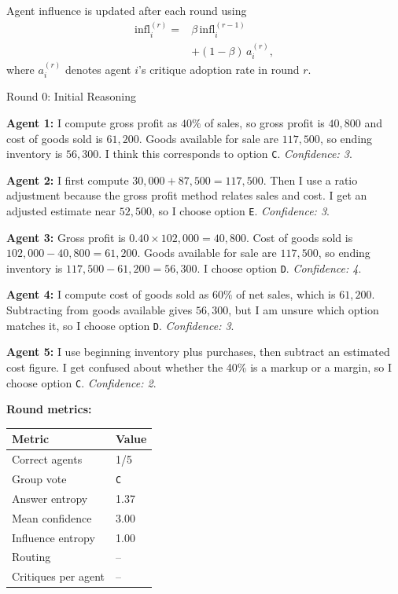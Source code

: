 Agent influence is updated after each round using
\[
\begin{aligned}
\mathrm{infl}_i^{(r)}={}&\beta\,\mathrm{infl}_i^{(r-1)}\\
&+(1-\beta)\,a_i^{(r)},
\end{aligned}
\]
where $a_i^{(r)}$ denotes agent $i$'s critique adoption rate in round $r$.

\begin{roundbox}{Round 0: Initial Reasoning}

\textbf{Agent 1:} I compute gross profit as $40\%$ of sales, so gross profit is $40{,}800$ and cost of goods sold is $61{,}200$. Goods available for sale are $117{,}500$, so ending inventory is $56{,}300$. I think this corresponds to option \texttt{C}. \textit{Confidence: 3}.

\textbf{Agent 2:} I first compute $30{,}000+87{,}500=117{,}500$. Then I use a ratio adjustment because the gross profit method relates sales and cost. I get an adjusted estimate near $52{,}500$, so I choose option \texttt{E}. \textit{Confidence: 3}.

\textbf{Agent 3:} Gross profit is $0.40\times 102{,}000=40{,}800$. Cost of goods sold is $102{,}000-40{,}800=61{,}200$. Goods available for sale are $117{,}500$, so ending inventory is $117{,}500-61{,}200=56{,}300$. I choose option \texttt{D}. \textit{Confidence: 4}.

\textbf{Agent 4:} I compute cost of goods sold as $60\%$ of net sales, which is $61{,}200$. Subtracting from goods available gives $56{,}300$, but I am unsure which option matches it, so I choose option \texttt{D}. \textit{Confidence: 3}.

\textbf{Agent 5:} I use beginning inventory plus purchases, then subtract an estimated cost figure. I get confused about whether the 40\% is a markup or a margin, so I choose option \texttt{C}. \textit{Confidence: 2}.

\vspace{1mm}
\textbf{Round metrics:}
\begin{center}
\footnotesize
\begin{tabular}{@{}ll@{}}
\toprule
Metric & Value \\
\midrule
Correct agents & 1/5 \\
Group vote & \texttt{C} \\
Answer entropy & 1.37 \\
Mean confidence & 3.00 \\
Influence entropy & 1.00 \\
Routing & -- \\
Critiques per agent & -- \\
\bottomrule
\end{tabular}
\end{center}

\end{roundbox}


